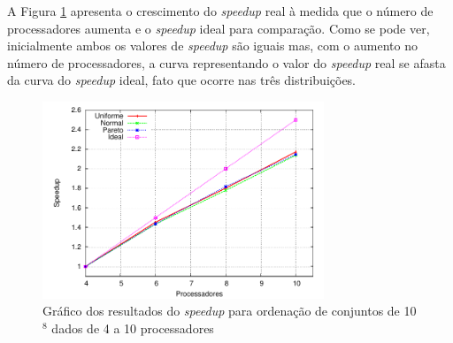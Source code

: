 %
% 
%

A Figura \ref{fig:MaquinasSpeedup} apresenta o crescimento do \textit{speedup} real à medida que o número de processadores aumenta e  o \textit{speedup} ideal para comparação. Como se pode ver, inicialmente ambos os valores de \textit{speedup} são iguais mas, com o aumento no número de processadores, a curva representando o valor do \textit{speedup} real se afasta da curva do \textit{speedup} ideal, fato que ocorre nas três distribuições.

\begin{figure}[htb]
\centering
\includegraphics[width=0.75\textwidth]{figuras/MaquinasSpeedup.pdf}
\caption{Gráfico dos resultados do \textit{speedup} para ordenação de conjuntos de 10$^8$ dados de 4 a 10 processadores}
\label{fig:MaquinasSpeedup}
\end{figure}


